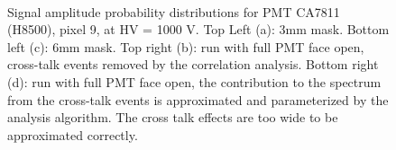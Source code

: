 \begin{figure}[hbt] 
\centering 
  \hfill
   \\
  \hfill
  \caption{Signal amplitude probability distributions for PMT CA7811 (H8500), pixel 9, at HV = 1000 V. Top Left (a): 3mm mask. Bottom left (c): 6mm mask. Top right (b): run with full PMT face open, cross-talk events removed by the correlation analysis. Bottom right (d): run with full PMT face open, the contribution to the spectrum from the cross-talk events is approximated and parameterized by the analysis algorithm. The cross talk effects are too wide to be approximated correctly.
    }
\label{fig:CA7811}
\end{figure}

